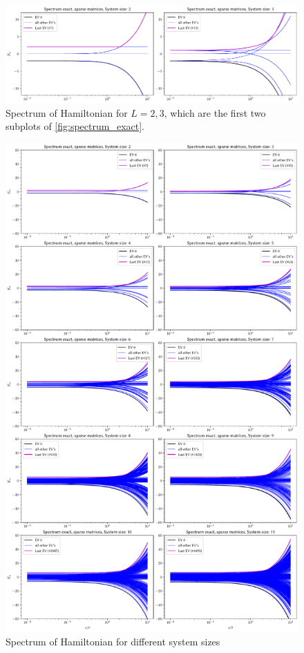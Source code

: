     \begin{figure}[b!]
        \centering
        \includegraphics[width=\textwidth]{graphics/spectrum_exact_manual_subset.pdf}
        \caption{Spectrum of Hamiltonian for $L = 2, 3$, which are the first two subplots of \autoref{fig:spectrum_exact}.}
        \label{fig:spectrum_exact_subset}
    \end{figure}

    \begin{figure}[t!]
        \centering
        \includegraphics[width=\textwidth]{graphics/spectrum_exact.pdf}
        \caption{Spectrum of Hamiltonian for different system sizes}
        \label{fig:spectrum_exact}
    \end{figure}
    \clearpage

